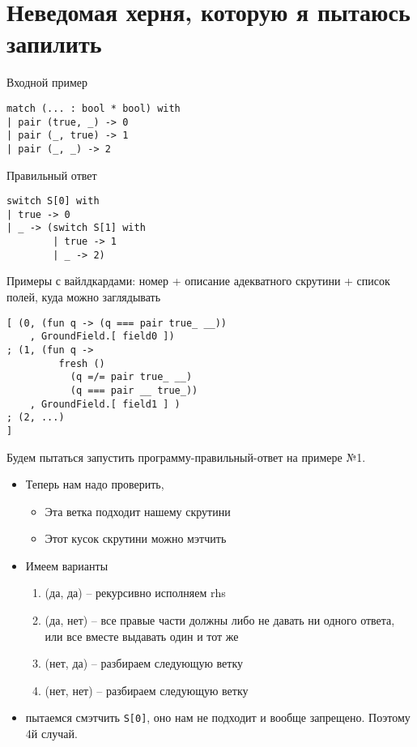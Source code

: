 \documentclass[a5paper,12pt]{article}
\begin{document}
\section{Неведомая херня, которую я пытаюсь запилить}
Входной пример
\begin{verbatim}
match (... : bool * bool) with
| pair (true, _) -> 0
| pair (_, true) -> 1
| pair (_, _) -> 2
\end{verbatim}
Правильный ответ
\begin{verbatim}
switch S[0] with
| true -> 0
| _ -> (switch S[1] with
        | true -> 1
        | _ -> 2)
\end{verbatim}
Примеры с вайлдкардами: номер + описание адекватного скрутини + список полей, куда можно заглядывать
\begin{verbatim}
[ (0, (fun q -> (q === pair true_ __))
    , GroundField.[ field0 ])
; (1, (fun q ->
         fresh () 
           (q =/= pair true_ __) 
           (q === pair __ true_))
    , GroundField.[ field1 ] )
; (2, ...)
]
\end{verbatim}
Будем пытаться запустить программу-правильный-ответ на примере №1.
\begin{itemize}
\item Теперь нам надо проверить, 
\begin{itemize}
\item Эта ветка подходит нашему скрутини
\item Этот кусок скрутини можно мэтчить
\end{itemize}
\item Имеем варианты
\begin{enumerate}
\item (да, да) -- рекурсивно исполняем rhs 
\item (да, нет) -- все правые части должны либо не давать ни одного ответа, или все вместе выдавать один и тот же  
\item (нет, да) -- разбираем следующую ветку
\item (нет, нет) -- разбираем следующую ветку
\end{enumerate}
\item пытаемся смэтчить \verb=S[0]=, оно нам не подходит и вообще запрещено. Поэтому 4й случай.
\end{itemize}
\end{document}
